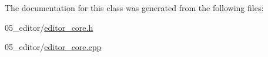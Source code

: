 The documentation for this class was generated from the following files\+:\begin{DoxyCompactItemize}
\item 
05\+\_\+editor/\hyperlink{editor__core_8h}{editor\+\_\+core.\+h}\item 
05\+\_\+editor/\hyperlink{editor__core_8cpp}{editor\+\_\+core.\+cpp}\end{DoxyCompactItemize}
